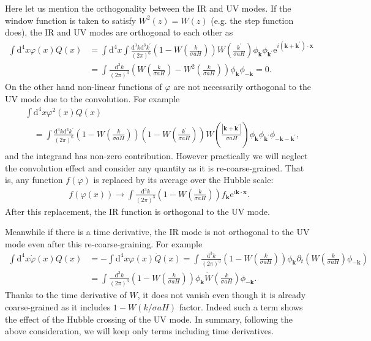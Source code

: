 \documentclass[aps, prd
, preprint
, nofootinbib 
]{revtex4-1}
\newcommand{\dd}{\mathrm{d}}
\newcommand{\ee}{\mathrm{e}}
\newcommand{\dk}{\frac{\dd^3k}{(2\pi)^3}}
\newcommand{\bae}[1]{\begin{align} #1 \end{align}}
\begin{document}
\bigskip
Here let us mention the orthogonality between the IR and UV modes.
If the window function is taken to satisfy $W^2(z)=W(z)$ (e.g. the step function does),
the IR and UV modes are orthogonal to each other as
\bae{
	\int\dd^4x\varphi(x)Q(x)&=\int\dd^4x\int\frac{\dd^3k\dd^3k^\prime}{(2\pi)^6}\left(1-W\left(\frac{k}{\sigma aH}\right)\right)
	W\left(\frac{k^\prime}{\sigma aH}\right)\phi_\mathbf{k}\phi_{\mathbf{k}^\prime}\ee^{i(\mathbf{k}+\mathbf{k}^\prime)\cdot\mathbf{x}} \nonumber \\
	&=\int\dk\left(W\left(\frac{k}{\sigma aH}\right)-W^2\left(\frac{k}{\sigma aH}\right)\right)\phi_\mathbf{k}\phi_{-\mathbf{k}}=0.
}
On the other hand non-linear functions of $\varphi$ are not necessarily orthogonal to the UV mode due to the convolution.
For example 
\bae{
	&\int\dd^4x\varphi^2(x)Q(x) \nonumber \\
	&\quad=\int\frac{\dd^3k\dd^3k^\prime}{(2\pi)^6}\left(1-W\left(\frac{k}{\sigma aH}\right)\right)
	\left(1-W\left(\frac{k^\prime}{\sigma aH}\right)\right)W\left(\frac{|\mathbf{k}+\mathbf{k}^\prime|}{\sigma aH}\right)
	\phi_\mathbf{k}\phi_{\mathbf{k}^\prime}\phi_{-\mathbf{k}-\mathbf{k}^\prime},
}
and the integrand has non-zero contribution. 
However practically we will neglect the convolution effect and consider any quantity as it is re-coarse-grained.
That is, any function $f(\varphi)$ is replaced by its average over the Hubble scale:
\bae{
	f(\varphi(x))\to\int\dk\left(1-W\left(\frac{k}{\sigma aH}\right)\right)f_\mathbf{k}\ee^{i\mathbf{k}\cdot\mathbf{x}}.
}
After this replacement, the IR function is orthogonal to the UV mode.

Meanwhile if there is a time derivative, the IR mode is not orthogonal to the UV mode even after this re-coarse-graining.
For example
\bae{
	\int\dd^4x\dot{\varphi}(x)Q(x)&=-\int\dd^4x\varphi(x)\dot{Q}(x)=\int\dk\left(1-W\left(\frac{k}{\sigma aH}\right)\right)\phi_\mathbf{k}
	\partial_t\left(W\left(\frac{k}{\sigma aH}\right)\phi_{-\mathbf{k}}\right) \nonumber \\
	&=\int\dk\left(1-W\left(\frac{k}{\sigma aH}\right)\right)\phi_\mathbf{k}
	\dot{W}\left(\frac{k}{\sigma aH}\right)\phi_{-\mathbf{k}}.
}
Thanks to the time derivative of $W$, it does not vanish even though it is already coarse-grained as it includes $1-W(k/\sigma aH)$ factor.
Indeed such a term shows the effect of the Hubble crossing of the UV mode.
In summary, following the above consideration, we will keep only terms including time derivatives.
\end{document}
